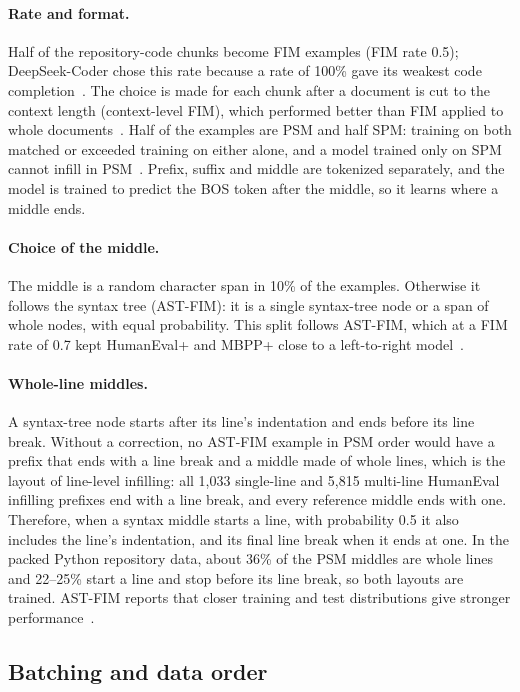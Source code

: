 \documentclass[sigconf,nonacm,balance=false]{acmart}
\begin{document}
\paragraph{Rate and format.} Half of the repository-code chunks become FIM examples (FIM rate 0.5); DeepSeek-Coder
chose this rate because a rate of 100\% gave its weakest code completion~\cite{guo2024deepseekcoder}. The choice is
made for each chunk after a document is cut to the context length (context-level FIM), which performed better than
FIM applied to whole documents~\cite{bavarian2022fim}. Half of the examples are PSM and half SPM: training on both
matched or exceeded training on either alone, and a model trained only on SPM cannot infill in
PSM~\cite{bavarian2022fim}. Prefix, suffix and middle are tokenized separately, and the model is trained to predict
the BOS token after the middle, so it learns where a middle ends.

\paragraph{Choice of the middle.} The middle is a random character span in 10\% of the examples. Otherwise it follows
the syntax tree (AST-FIM): it is a single syntax-tree node or a span of whole nodes, with equal probability. This
split follows AST-FIM, which at a FIM rate of 0.7 kept HumanEval+ and MBPP+ close to a left-to-right
model~\cite{gong2025astfim}.

\paragraph{Whole-line middles.} A syntax-tree node starts after its line's indentation and ends before its line
break. Without a correction, no AST-FIM example in PSM order would have a prefix that ends with a line break and a
middle made of whole lines, which is the layout of line-level infilling: all 1,033 single-line and 5,815 multi-line
HumanEval infilling prefixes end with a line break, and every reference middle ends with one. Therefore, when a syntax
middle starts a line, with probability 0.5 it also includes the line's indentation, and its final line break when it
ends at one. In the packed Python repository data, about 36\% of the PSM middles are whole lines and 22--25\% start a
line and stop before its line break, so both layouts are trained. AST-FIM reports that closer training and test
distributions give stronger performance~\cite{gong2025astfim}.

\subsection{Batching and data order}
\end{document}
